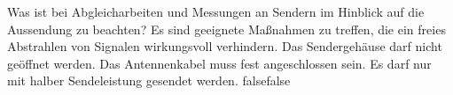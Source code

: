     {Was ist bei Abgleicharbeiten und Messungen an Sendern im Hinblick auf die Aussendung zu beachten?}
    {Es sind geeignete Maßnahmen zu treffen, die ein freies Abstrahlen von Signalen wirkungsvoll verhindern.}
    {Das Sendergehäuse darf nicht geöffnet werden.}
    {Das Antennenkabel muss fest angeschlossen sein.}
    {Es darf nur mit halber Sendeleistung gesendet werden.}
    {false}{false}